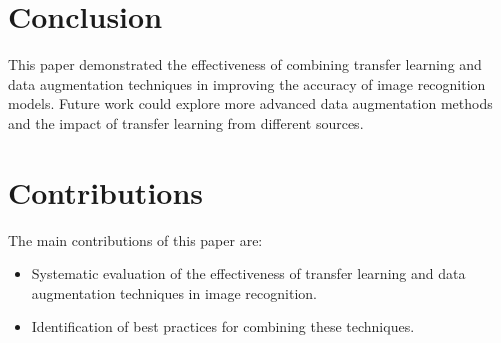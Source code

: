 \documentclass{article}
\begin{document}
\section{Conclusion}
\label{sec:conclusion}
This paper demonstrated the effectiveness of combining transfer learning and data augmentation techniques in improving the accuracy of image recognition models. Future work could explore more advanced data augmentation methods and the impact of transfer learning from different sources.

\section{Contributions}
\label{sec:contributions}
The main contributions of this paper are:
\begin{itemize}
    \item Systematic evaluation of the effectiveness of transfer learning and data augmentation techniques in image recognition.
    \item Identification of best practices for combining these techniques.
\end{itemize}



\end{document}
